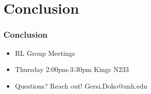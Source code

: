 \documentclass{beamer}
\begin{document}
\section*{Conclusion}

\begin{frame}
	\frametitle{Conclusion}
	\begin{itemize}
	  \item RL Group Meetings 
	  \item Thursday 2:00pm-3:30pm Kings N233
	  \vfill
	  \item Questions? Reach out! Gersi.Doko@unh.edu
	\end{itemize}
\end{frame}
\end{document}

